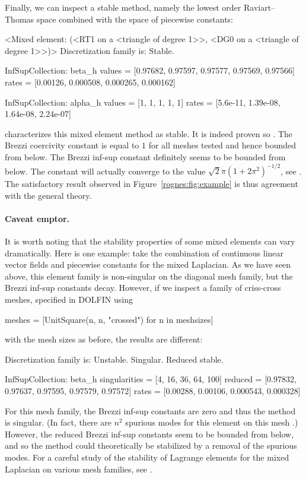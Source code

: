 Finally, we can inspect a stable method, namely the lowest order
Raviart--Thomas space combined with the space of piecewise constants:
\begin{progoutput}
<Mixed element: (<RT1 on a <triangle of degree 1>>,
<DG0 on a <triangle of degree 1>>)>
Discretization family is: Stable.

InfSupCollection: beta_h
values =         [0.97682, 0.97597, 0.97577, 0.97569, 0.97566]
rates  =         [0.00126, 0.000508, 0.000265, 0.000162]

InfSupCollection: alpha_h
values =         [1, 1, 1, 1, 1]
rates  =         [5.6e-11, 1.39e-08, 1.64e-08, 2.24e-07]
\end{progoutput}
\rognesascot{} characterizes this mixed element method as stable. It
is indeed proven so \citep{RaviartThomas1977}. The Brezzi coercivity
constant is equal to $1$ for all meshes tested and hence bounded from
below. The Brezzi inf-sup constant definitely seems to be bounded from
below. The constant will actually converge to the value $\sqrt{2} \pi
(1 + 2 \pi^2)^{-1/2}$, see \citep{ArnoldRognes2009}.  The satisfactory
result observed in
Figure~\ref{rognes:fig:example} is thus
agreement with the general theory.

\paragraph*{Caveat emptor.}

It is worth noting that the stability properties of some mixed
elements can vary dramatically. Here is one example: take the
combination of continuous linear vector fields and piecewise constants
for the mixed Laplacian. As we have seen above, this element family is
non-singular on the diagonal mesh family, but the Brezzi inf-sup
constants decay. However, if we inspect a family of criss-cross
meshes, specified in DOLFIN using
\begin{python}
meshes = [UnitSquare(n, n, "crossed") for n in meshsizes]
\end{python}
with the mesh sizes as before, the results are different:
\begin{progoutput}
Discretization family is: Unstable. Singular. Reduced stable.

InfSupCollection: beta_h
singularities = [4, 16, 36, 64, 100]
reduced =        [0.97832, 0.97637, 0.97595, 0.97579, 0.97572]
rates  =         [0.00288, 0.00106, 0.000543, 0.000328]
\end{progoutput}
For this mesh family, the Brezzi inf-sup constants are zero and thus
the method is singular. (In fact, there are $n^2$ spurious modes for
this element on this mesh \citep{Qin1994}.) However, the reduced
Brezzi inf-sup constants seem to be bounded from below, and so the
method could theoretically be stabilized by a removal of the spurious
modes. For a careful study of the stability of Lagrange elements for
the mixed Laplacian on various mesh families,
see \citet{ArnoldRognes2009}.

